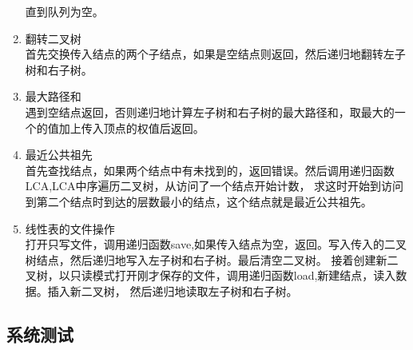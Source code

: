 \documentclass[supercite]{Experimental_Report}
\theoremstyle{definition}
\begin{document}
\begin{enumerate}
	直到队列为空。
	\item 翻转二叉树\\
	首先交换传入结点的两个子结点，如果是空结点则返回，然后递归地翻转左子树和右子树。
	\item 最大路径和\\
	遇到空结点返回，否则递归地计算左子树和右子树的最大路径和，取最大的一个的值加上传入顶点的权值后返回。
	\item 最近公共祖先\\
	首先查找结点，如果两个结点中有未找到的，返回错误。然后调用递归函数LCA,LCA中序遍历二叉树，从访问了一个结点开始计数，
	求这时开始到访问到第二个结点时到达的层数最小的结点，这个结点就是最近公共祖先。
	\item 线性表的文件操作\\
	打开只写文件，调用递归函数save,如果传入结点为空，返回。写入传入的二叉树结点，然后递归地写入左子树和右子树。最后清空二叉树。
	接着创建新二叉树，以只读模式打开刚才保存的文件，调用递归函数load,新建结点，读入数据。插入新二叉树，
	然后递归地读取左子树和右子树。
\end{enumerate}
\subsection{系统测试}
\end{document}
